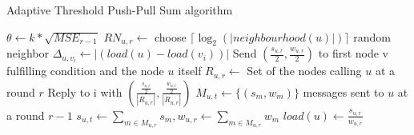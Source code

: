 \begin{algorithm}
    \caption{Adaptive Threshold Push-Pull Sum algorithm}\label{alg:PPS}
    \begin{algorithmic}[1]
    \State $\theta \leftarrow k * \sqrt{MSE_{r-1}}$ 
    \EndProcedure
    \State $RN_{u,r} \leftarrow$ choose $\lceil \log_{2}{(|neighbourhood(u)|)} \rceil$ random neighbor
    \State $\Delta_{u, v_{i}} \leftarrow |(load(u) - load(v_{i}))|$
    \State Send $(\frac{s_{u,r}}{2}, \frac{w_{u,r}}{2})$ to first node v fulfilling condition and the node $u$ itself
    \EndIf
    \EndFor
    \EndProcedure
    \State $R_{u,r} \leftarrow$ Set of the nodes calling $u$ at a round $r$
    \State Reply to i with $\left( \frac{\frac{s_{u,r}}{2}}{|R_{u,r}|}, \frac{\frac{w_{u,r}}{2}}{|R_{u,r}|} \right)$
    \EndFor
    \EndProcedure
    \State $M_{u,t} \leftarrow \{(s_{m}, w_{m})\}$ messages sent to $u$ at a round $r-1$
    \State $s_{u,t} \leftarrow \sum_{m \in M_{u,r}}^{}s_{m}, w_{u,r} \leftarrow\sum_{m \in M_{u,r}}^{}w_{m}$
    \State $load(u) \leftarrow \frac{s_{u,r}}{w_{u,r}}$
    \EndProcedure
    \end{algorithmic}
    \end{algorithm}